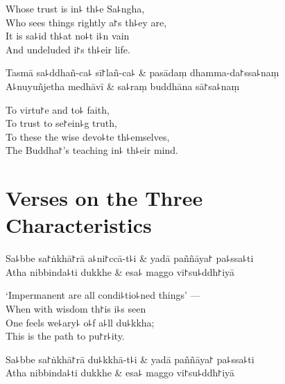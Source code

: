 \begin{english}
  Whose trust is in꜕ th꜕e Sa꜕ngha,\\
  Who sees things rightly a꜓s th꜕ey are,\\
  It is sa꜕id th꜕at no꜕t i꜕n vain\\
  And undeluded i꜓s th꜕eir life.
\end{english}

\begin{twochants}
  Tasmā sa꜕ddhañ-ca꜕ sī꜓lañ-ca꜕ & pasādaṃ dhamma-da꜓ssa꜕naṃ \\
  A꜕nuyuñjetha medhāvī & sa꜕raṃ buddhāna sā꜓sa꜕naṃ \\
\end{twochants}

\begin{english}
  To virtu꜓e and to꜕ faith,\\
  To trust to se꜓ein꜕g truth,\\
  To these the wise devo꜕te th꜕emselves,\\
  The Buddha꜓'s teaching in꜕ th꜕eir mind.
\end{english}

\chapter{Verses on the Three Characteristics}%


\begin{leader}
\end{leader}

\begin{twochants}
  Sa꜕bbe sa꜓ṅkhā꜓rā a꜕ni꜓ccā-t꜕i & yadā paññāya꜓ pa꜕ssa꜕ti \\
  Atha nibbinda꜕ti dukkhe & esa꜕ maggo vi꜓su꜕ddh꜓iyā \\
\end{twochants}

\begin{english}
  `Impermanent are all condi꜕tio꜕ned things' ---\\
  When with wisdom th꜓is i꜕s seen\\
  One feels we꜕ary꜕ o꜕f a꜕ll du꜕kkha;\\
  This is the path to pu꜓r꜕ity.
\end{english}

\begin{twochants}
  Sa꜕bbe sa꜓ṅkhā꜓rā du꜕kkhā-t꜕i & yadā paññāya꜓ pa꜕ssa꜕ti \\
  Atha nibbinda꜕ti dukkhe & esa꜕ maggo vi꜓su꜕ddh꜓iyā \\
\end{twochants}

